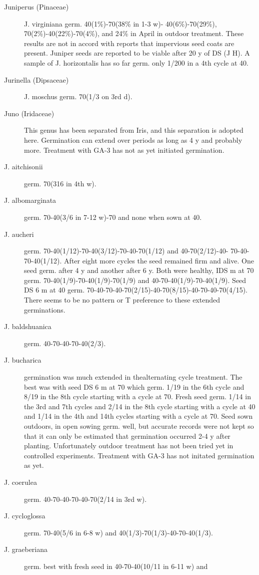 \begin{description}
\item[Juniperus (Pinaceae)] J. virginiana germ. 40(1\%)-70(38\% in 1-3 w)-
40(6\%)-70(29\%), 70(2\%)-40(22\%)-70(4\%), and 24\% in April in outdoor treatment.
These results are not in accord with reports that impervious seed coats are present.
Juniper seeds are reported to be viable after 20 y of DS (J H). A sample of J.
horizontalis has so far germ. only 1/200 in a 4th cycle at 40.
\item[Jurinella (Dipsaceae)] J. moschus germ. 70(1/3 on 3rd d).
\item[Juno (Iridaceae)] This genus has been separated from Iris, and this
separation is adopted here. Germination can extend over periods as long as 4 y and
probably more. Treatment with GA-3 has not as yet initiated germination.
\item[J. aitchisonii] germ. 70(316 in 4th w).
\item[J. albomarginata] germ. 70-40(3/6 in 7-12 w)-70 and none when sown at 40.
\item[J. aucheri] germ. 70-40(1/12)-70-40(3/12)-70-40-70(1/12) and 40-70(2/12)-40-
70-40-70-40(1/12). After eight more cycles the seed remained firm and alive. One
seed germ. after 4 y and another after 6 y. Both were healthy, IDS m at 70
germ. 70-40(1/9)-70-40(1/9)-70(1/9) and 40-70-40(1/9)-70-40(1/9). Seed DS 6 m at
40 germ. 70-40-70-40-70(2/15)-40-70(8/15)-40-70-40-70(4/15). There seems to be no
pattern or T preference to these extended germinations.
\item[J. baldshuanica] germ. 40-70-40-70-40(2/3).
\item[J. bucharica] germination was much extended in thealternating cycle treatment.
The best was with seed DS 6 m at 70 which germ. 1/19 in the 6th cycle and 8/19 in the
8th cycle starting with a cycle at 70. Fresh seed germ. 1/14 in the 3rd and 7th cycles
and 2/14 in the 8th cycle starting with a cycle at 40 and 1/14 in the 4th and 14th cycles
starting with a cycle at 70. Seed sown outdoors, in open sowing germ. well, but
accurate records were not kept so that it can only be estimated that germination
occurred 2-4 y after planting. Unfortunately outdoor treatment has not been tried yet in
controlled experiments. Treatment with GA-3 has not initated germination as yet.
\item[J. coerulea] germ. 40-70-40-70-40-70(2/14 in 3rd w).
\item[J. cycloglossa] germ. 70-40(5/6 in 6-8 w) and 40(1/3)-70(1/3)-40-70-40(1/3).
\item[J. graeberiana] germ. best with fresh seed in 40-70-40(10/11 in 6-11 w) and

\end{description}
